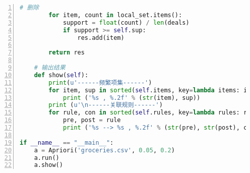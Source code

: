 \documentclass[12pt,a4paper]{article}
\theoremstyle{definition}
\begin{document}
\begin{appendix}
\begin{lstlisting}[language=Python,
	numbers=left,
	keywordstyle=\color{blue!70},
	frame=shadowbox,
	breaklines=True]
        # 删除
        for item, count in local_set.items():
            support = float(count) / len(deals)
            if support >= self.sup:
                res.add(item)

        return res

    # 输出结果
    def show(self):
        print(u'------频繁项集------')
        for item, sup in sorted(self.items, key=lambda items: items[1]):
            print ('%s , %.2f' % (str(item), sup))
        print (u'\n------关联规则------')
        for rule, con in sorted(self.rules, key=lambda rules: rules[1]):
            pre, post = rule
            print ('%s --> %s , %.2f' % (str(pre), str(post), con))

if __name__ == "__main__":
    a = Apriori('groceries.csv', 0.05, 0.2)
    a.run()
    a.show()
	\end{lstlisting}
	
\end{appendix}

\end{document}
